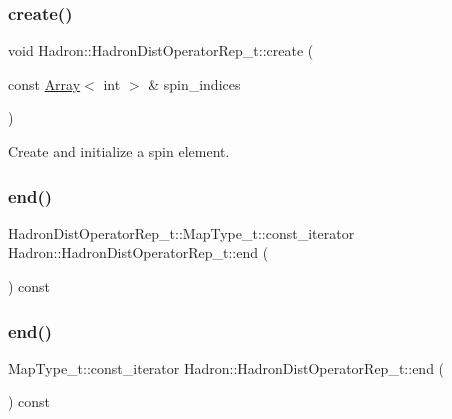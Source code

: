 \subsubsection{\texorpdfstring{create()}{create()}\hspace{0.1cm}{\footnotesize\ttfamily [2/2]}}
{\footnotesize\ttfamily void Hadron\+::\+Hadron\+Dist\+Operator\+Rep\+\_\+t\+::create (\begin{DoxyParamCaption}\item[{const \mbox{\hyperlink{classXMLArray_1_1Array}{Array}}$<$ int $>$ \&}]{spin\+\_\+indices }\end{DoxyParamCaption})\hspace{0.3cm}{\ttfamily [protected]}}



Create and initialize a spin element. 

\mbox{\label{classHadron_1_1HadronDistOperatorRep__t_ae811537842e96e1161375ffe7dd65ca2}} 
\subsubsection{\texorpdfstring{end()}{end()}\hspace{0.1cm}{\footnotesize\ttfamily [1/2]}}
{\footnotesize\ttfamily Hadron\+Dist\+Operator\+Rep\+\_\+t\+::\+Map\+Type\+\_\+t\+::const\+\_\+iterator Hadron\+::\+Hadron\+Dist\+Operator\+Rep\+\_\+t\+::end (\begin{DoxyParamCaption}{ }\end{DoxyParamCaption}) const}

\mbox{\label{classHadron_1_1HadronDistOperatorRep__t_a5619645b5dc3bfb3ab0f15cebe15ecf6}} 
\subsubsection{\texorpdfstring{end()}{end()}\hspace{0.1cm}{\footnotesize\ttfamily [2/2]}}
{\footnotesize\ttfamily Map\+Type\+\_\+t\+::const\+\_\+iterator Hadron\+::\+Hadron\+Dist\+Operator\+Rep\+\_\+t\+::end (\begin{DoxyParamCaption}{ }\end{DoxyParamCaption}) const}

